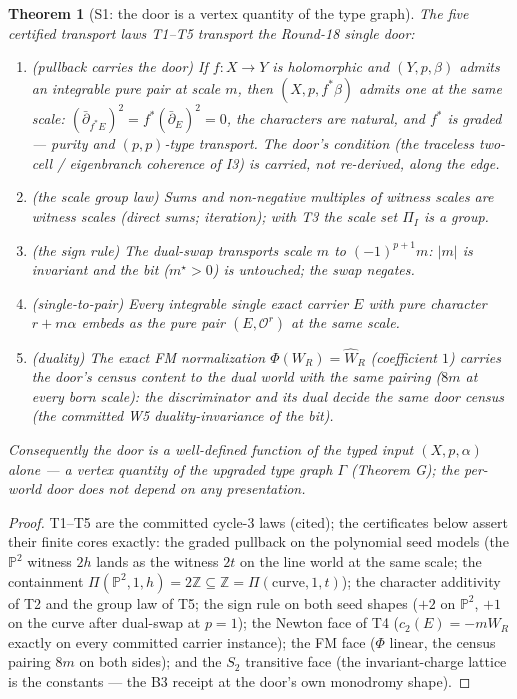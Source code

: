 \documentclass[11pt]{article}
\newtheorem{theorem}{Theorem}
\begin{document}
\begin{theorem}[S1: the door is a vertex quantity of the type graph]
\label{thm:s1}
The five certified transport laws T1--T5 transport the Round-18 single door:
\begin{enumerate}
\item[\textup{T1}] \emph{(pullback carries the door)} If $f\colon X\to Y$ is
holomorphic and $(Y,p,\beta)$ admits an integrable pure pair at scale $m$, then
$(X,p,f^*\beta)$ admits one at the \emph{same} scale: $(\bar\partial_{f^*E})^2
=f^*(\bar\partial_E)^2=0$, the characters are natural, and $f^*$ is graded ---
purity and $(p,p)$-type transport. The door's \emph{condition} (the traceless
two-cell / eigenbranch coherence of I3) is carried, not re-derived, along the edge.
\item[\textup{T2/T5}] \emph{(the scale group law)} Sums and non-negative multiples
of witness scales are witness scales (direct sums; iteration); with T3 the scale
set $\Pi_I$ is a group.
\item[\textup{T3}] \emph{(the sign rule)} The dual-swap transports scale $m$ to
$(-1)^{p+1}m$: $|m|$ is invariant and the \emph{bit} ($m^\star>0$) is untouched;
the swap negates.
\item[\textup{T4}] \emph{(single-to-pair)} Every integrable single exact carrier
$E$ with pure character $r+m\alpha$ embeds as the pure pair $(E,\mathcal O^r)$ at
the same scale.
\item[\textup{(FM face)}] \emph{(duality)} The exact FM normalization
$\Phi(W_R)=\hat W_R$ (coefficient $1$) carries the door's census content to the
dual world with the same pairing ($8m$ at every born scale): the discriminator
and its dual decide the same door census (the committed W5 duality-invariance
of the bit).
\end{enumerate}
Consequently the door is a well-defined function of the \emph{typed input}
$(X,p,\alpha)$ alone --- a vertex quantity of the upgraded type graph $\Gamma$
(Theorem G); the per-world door does not depend on any presentation.
\end{theorem}

\begin{proof}
T1--T5 are the committed cycle-3 laws (cited); the certificates below assert
their finite cores exactly: the graded pullback on the polynomial seed models
(the $\mathbb P^2$ witness $2h$ lands as the witness $2t$ on the line world at
the same scale; the containment $\Pi(\mathbb P^2,1,h)=2\mathbb Z\subseteq
\mathbb Z=\Pi(\text{curve},1,t)$); the character additivity of T2 and the
group law of T5; the sign rule on both seed shapes ($+2$ on $\mathbb P^2$,
$+1$ on the curve after dual-swap at $p=1$); the Newton face of T4
($c_2(E)=-mW_R$ exactly on every committed carrier instance); the FM face
($\Phi$ linear, the census pairing $8m$ on both sides); and the $S_2$
transitive face (the invariant-charge lattice is the constants --- the B3
receipt at the door's own monodromy shape).
\end{proof}
\end{document}
